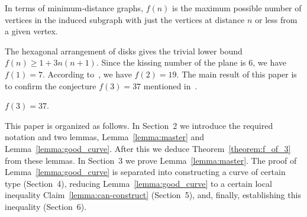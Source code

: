 In terms of minimum-distance graphs, $f(n)$ is the maximum possible number of vertices in the induced subgraph with just the vertices at distance $n$ or less from a given vertex. %

The hexagonal arrangement of disks gives the trivial lower bound $f(n) \geq 1 + {3n(n+1)}.$ Since the kissing number of the plane is $6$, we have $f(1) = 7$. According to~\cite{toth_heppes}, we have $f(2) = 19$. The main result of this paper is to confirm the conjecture $f(3) = 37$ mentioned in~\cite{furedi}.

\begin{theorem}\label{theorem:f_of_3} $f(3) = 37$.
\end{theorem}




This paper is organized as follows. In Section~2 we introduce the required notation and two lemmas, Lemma~\ref{lemma:master} and Lemma~\ref{lemma:good_curve}. After this we deduce Theorem~\ref{theorem:f_of_3} from these lemmas. In Section~3 we prove Lemma~\ref{lemma:master}. The proof of Lemma~\ref{lemma:good_curve} is separated into constructing a curve of certain type (Section~4), reducing Lemma~\ref{lemma:good_curve} to a certain local inequality Claim~\ref{lemma:can-construct} (Section~5), and, finally, establishing this inequality (Section~6).


